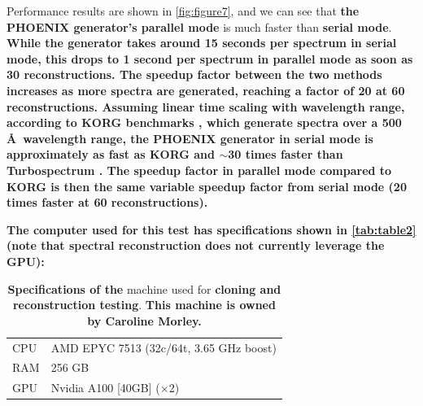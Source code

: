 \documentclass[twocolumn, linenumbers]{aastex631}
\begin{document}
Performance results are shown in \autoref{fig:figure7}, and we can see that \textbf{the PHOENIX generator's parallel mode} is much faster than \textbf{serial mode}.
\textbf{While the generator takes around 15 seconds per spectrum in serial mode, this drops to 1 second per spectrum in parallel mode as soon as 30 reconstructions.
The speedup factor between the two methods increases as more spectra are generated, reaching a factor of 20 at 60 reconstructions.
Assuming linear time scaling with wavelength range, according to KORG benchmarks \citep{korg}, which generate spectra over a 500 \AA \ wavelength range, the PHOENIX generator in serial mode is approximately as fast as KORG and $\sim$30 times faster than Turbospectrum \citep{turbospectrum}.
The speedup factor in parallel mode compared to KORG is then the same variable speedup factor from serial mode (20 times faster at 60 reconstructions).}

\textbf{The computer used for this test has specifications shown in \autoref{tab:table2} (note that spectral reconstruction does not currently leverage the GPU):}
\begin{table}[h!]
    \centering
    \begin{tabular}{ll}
        \hline
        CPU & AMD EPYC 7513 (32c/64t, 3.65 GHz boost)\\
        RAM & 256 GB\\
        GPU & Nvidia A100 [40GB] ($\times$2)\\
        \hline
    \end{tabular}
    \caption{\textbf{Specifications of the} machine used for \textbf{cloning and reconstruction testing}.
    \textbf{This machine is owned by Caroline Morley.}}
    \label{tab:table2}
\end{table}
\end{document}

